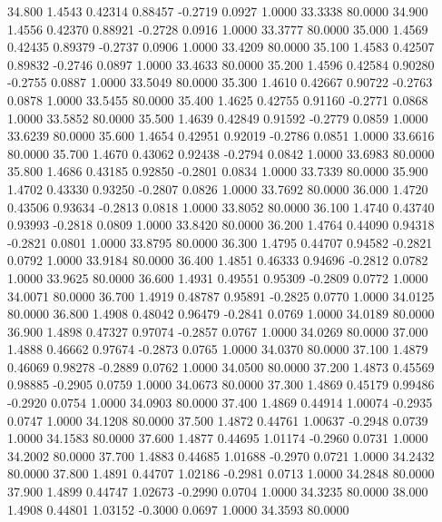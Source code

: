   34.800   1.4543   0.42314   0.88457  -0.2719   0.0927   1.0000  33.3338  80.0000
  34.900   1.4556   0.42370   0.88921  -0.2728   0.0916   1.0000  33.3777  80.0000
  35.000   1.4569   0.42435   0.89379  -0.2737   0.0906   1.0000  33.4209  80.0000
  35.100   1.4583   0.42507   0.89832  -0.2746   0.0897   1.0000  33.4633  80.0000
  35.200   1.4596   0.42584   0.90280  -0.2755   0.0887   1.0000  33.5049  80.0000
  35.300   1.4610   0.42667   0.90722  -0.2763   0.0878   1.0000  33.5455  80.0000
  35.400   1.4625   0.42755   0.91160  -0.2771   0.0868   1.0000  33.5852  80.0000
  35.500   1.4639   0.42849   0.91592  -0.2779   0.0859   1.0000  33.6239  80.0000
  35.600   1.4654   0.42951   0.92019  -0.2786   0.0851   1.0000  33.6616  80.0000
  35.700   1.4670   0.43062   0.92438  -0.2794   0.0842   1.0000  33.6983  80.0000
  35.800   1.4686   0.43185   0.92850  -0.2801   0.0834   1.0000  33.7339  80.0000
  35.900   1.4702   0.43330   0.93250  -0.2807   0.0826   1.0000  33.7692  80.0000
  36.000   1.4720   0.43506   0.93634  -0.2813   0.0818   1.0000  33.8052  80.0000
  36.100   1.4740   0.43740   0.93993  -0.2818   0.0809   1.0000  33.8420  80.0000
  36.200   1.4764   0.44090   0.94318  -0.2821   0.0801   1.0000  33.8795  80.0000
  36.300   1.4795   0.44707   0.94582  -0.2821   0.0792   1.0000  33.9184  80.0000
  36.400   1.4851   0.46333   0.94696  -0.2812   0.0782   1.0000  33.9625  80.0000
  36.600   1.4931   0.49551   0.95309  -0.2809   0.0772   1.0000  34.0071  80.0000
  36.700   1.4919   0.48787   0.95891  -0.2825   0.0770   1.0000  34.0125  80.0000
  36.800   1.4908   0.48042   0.96479  -0.2841   0.0769   1.0000  34.0189  80.0000
  36.900   1.4898   0.47327   0.97074  -0.2857   0.0767   1.0000  34.0269  80.0000
  37.000   1.4888   0.46662   0.97674  -0.2873   0.0765   1.0000  34.0370  80.0000
  37.100   1.4879   0.46069   0.98278  -0.2889   0.0762   1.0000  34.0500  80.0000
  37.200   1.4873   0.45569   0.98885  -0.2905   0.0759   1.0000  34.0673  80.0000
  37.300   1.4869   0.45179   0.99486  -0.2920   0.0754   1.0000  34.0903  80.0000
  37.400   1.4869   0.44914   1.00074  -0.2935   0.0747   1.0000  34.1208  80.0000
  37.500   1.4872   0.44761   1.00637  -0.2948   0.0739   1.0000  34.1583  80.0000
  37.600   1.4877   0.44695   1.01174  -0.2960   0.0731   1.0000  34.2002  80.0000
  37.700   1.4883   0.44685   1.01688  -0.2970   0.0721   1.0000  34.2432  80.0000
  37.800   1.4891   0.44707   1.02186  -0.2981   0.0713   1.0000  34.2848  80.0000
  37.900   1.4899   0.44747   1.02673  -0.2990   0.0704   1.0000  34.3235  80.0000
  38.000   1.4908   0.44801   1.03152  -0.3000   0.0697   1.0000  34.3593  80.0000
